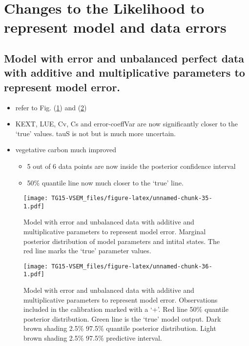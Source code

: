 \documentclass[]{article}
\providecommand{\tightlist}{%
  \setlength{\itemsep}{0pt}\setlength{\parskip}{0pt}}
\begin{document}
\section{Changes to the Likelihood to represent model and data
errors}\label{changes-to-the-likelihood-to-represent-model-and-data-errors}

\subsection{Model with error and unbalanced perfect data with additive
and multiplicative parameters to represent model
error.}\label{model-with-error-and-unbalanced-perfect-data-with-additive-and-multiplicative-parameters-to-represent-model-error.}

\begin{itemize}
\tightlist
\item
  refer to Fig. (\ref{fig:errModunbalDatamodLikePar}) and
  (\ref{fig:errModunbalDatamodLikeOut})
\item
  KEXT, LUE, Cv, Cs and error-coeffVar are now significantly closer to
  the `true' values. tauS is not but is much more uncertain.
\item
  vegetative carbon much improved

  \begin{itemize}
  \tightlist
  \item
    5 out of 6 data points are now inside the posterior confidence
    interval
  \item
    50\% quantile line now much closer to the `true' line.
  \end{itemize}
\end{itemize}

\begin{figure}
\centering
\texttt{[image: TG15-VSEM\_files/figure-latex/unnamed-chunk-35-1.pdf]}
\caption{\label{fig:errModunbalDatamodLikePar}Model with error and
unbalanced data with additive and multiplicative parameters to represent
model error. Marginal posterior distribution of model parameters and
intital states. The red line marks the `true' parameter values.}
\end{figure}

\begin{figure}
\centering
\texttt{[image: TG15-VSEM\_files/figure-latex/unnamed-chunk-36-1.pdf]}
\caption{\label{fig:errModunbalDatamodLikeOut}Model with error and
unbalanced data with additive and multiplicative parameters to represent
model error. Observations included in the calibration marked with a `+'.
Red line 50\% quantile posterior distribution. Green line is the `true'
model output. Dark brown shading 2.5\% 97.5\% quantile posterior
distribution. Light brown shading 2.5\% 97.5\% predictive interval.}
\end{figure}
\end{document}
